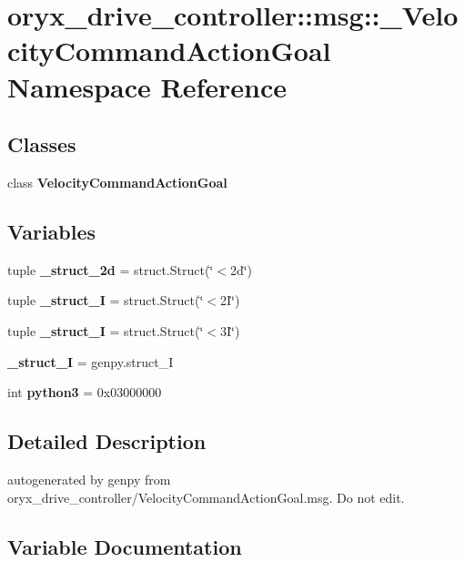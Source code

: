 \section{oryx\-\_\-drive\-\_\-controller\-:\-:msg\-:\-:\-\_\-\-Velocity\-Command\-Action\-Goal \-Namespace \-Reference}
\label{namespaceoryx__drive__controller_1_1msg_1_1__VelocityCommandActionGoal}
\subsection*{\-Classes}
\begin{DoxyCompactItemize}
\item 
class {\bf \-Velocity\-Command\-Action\-Goal}
\end{DoxyCompactItemize}
\subsection*{\-Variables}
\begin{DoxyCompactItemize}
\item 
tuple {\bf \-\_\-struct\-\_\-2d} = struct.\-Struct(\char`\"{}$<$2d\char`\"{})
\item 
tuple {\bf \-\_\-struct\-\_\-I} = struct.\-Struct(\char`\"{}$<$2\-I\char`\"{})
\item 
tuple {\bf \-\_\-struct\-\_\-I} = struct.\-Struct(\char`\"{}$<$3\-I\char`\"{})
\item 
{\bf \-\_\-struct\-\_\-\-I} = genpy.\-struct\-\_\-\-I
\item 
int {\bf python3} = 0x03000000
\end{DoxyCompactItemize}


\subsection{\-Detailed \-Description}
\begin{DoxyVerb}autogenerated by genpy from oryx_drive_controller/VelocityCommandActionGoal.msg. Do not edit.\end{DoxyVerb}
 

\subsection{\-Variable \-Documentation}
